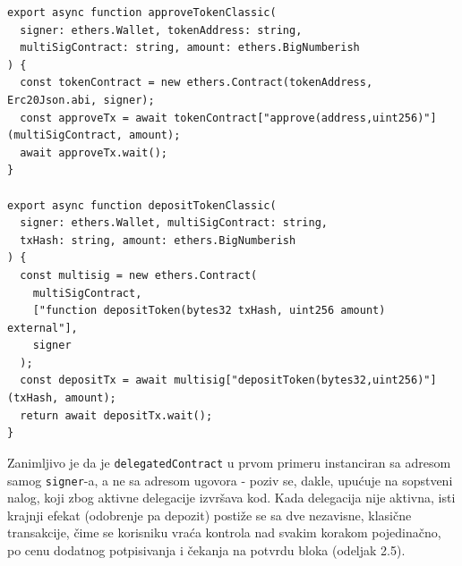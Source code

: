 \newpage

\begin{lstlisting}[caption={Deponovanje bez delegacije - dve odvojene transakcije}, label={lst:deposit-classic}]
export async function approveTokenClassic(
  signer: ethers.Wallet, tokenAddress: string,
  multiSigContract: string, amount: ethers.BigNumberish
) {
  const tokenContract = new ethers.Contract(tokenAddress, Erc20Json.abi, signer);
  const approveTx = await tokenContract["approve(address,uint256)"](multiSigContract, amount);
  await approveTx.wait();
}

export async function depositTokenClassic(
  signer: ethers.Wallet, multiSigContract: string,
  txHash: string, amount: ethers.BigNumberish
) {
  const multisig = new ethers.Contract(
    multiSigContract,
    ["function depositToken(bytes32 txHash, uint256 amount) external"],
    signer
  );
  const depositTx = await multisig["depositToken(bytes32,uint256)"](txHash, amount);
  return await depositTx.wait();
}
\end{lstlisting}

Zanimljivo je da je \texttt{delegatedContract} u prvom primeru instanciran sa adresom samog \texttt{signer}-a, a ne sa adresom  ugovora - poziv se, dakle, upu\' cuje na sopstveni nalog, koji zbog aktivne delegacije izvr\v sava  kod. Kada delegacija nije aktivna, isti krajnji efekat (odobrenje pa depozit) posti\v ze se sa dve nezavisne, klasi\v cne transakcije, \v cime se korisniku vra\' ca kontrola nad svakim korakom pojedina\v cno, po cenu dodatnog potpisivanja i \v cekanja na potvrdu bloka (odeljak 2.5).
